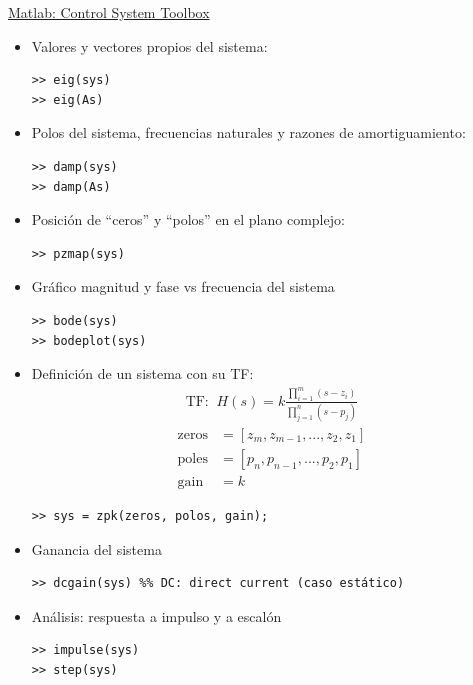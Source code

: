 \underline{Matlab: Control System Toolbox}\\
\begin{itemize}
    \item Valores y vectores propios del sistema:
\begin{verbatim}
>> eig(sys)
>> eig(As)
\end{verbatim}
\item Polos del sistema, frecuencias naturales y razones de amortiguamiento:
\begin{verbatim}
>> damp(sys)
>> damp(As)
\end{verbatim}
\item Posición de ``ceros'' y ``polos'' en el plano complejo:
\begin{verbatim}
>> pzmap(sys)
\end{verbatim}
\item Gráfico magnitud y fase vs frecuencia del sistema
\begin{verbatim}
>> bode(sys)
>> bodeplot(sys)
\end{verbatim}
\item Definición de un sistema con su TF:
\begin{align*}
    \text{TF: }~H(s)= k\frac{\prod_{i=1}^m(s-z_i)}{\prod_{j=1}^n(s-p_j)}
\end{align*} 
\begin{align*}
    \text{zeros} &= [z_m, z_{m-1}, ..., z_2, z_1]\\
    \text{poles} &= [p_n, p_{n-1},..., p_2, p_1]\\
    \text{gain} &= k
\end{align*} 
\begin{verbatim}
>> sys = zpk(zeros, polos, gain); 
\end{verbatim}

\item Ganancia del sistema
\begin{verbatim}
>> dcgain(sys) %% DC: direct current (caso estático)
\end{verbatim}

\item Análisis: respuesta a impulso y a escalón
\begin{verbatim}
>> impulse(sys)
>> step(sys)
\end{verbatim}
\end{itemize}




